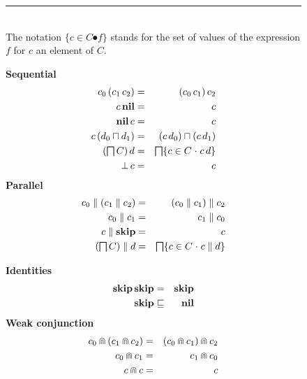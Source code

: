 \documentclass[fleqn]{fac}
\newcommand{\figurerule}{\rule{\textwidth}{0.5pt}}
\newcommand{\labelaxiom}[1]{\label{axiom-#1}\index{Axiom!#1|AxiomDef{\ref{axiom-#1}}}}
\newcommand{\SSeq}{\,}
\newcommand{\Nil}{\Keyword{nil}}
\newcommand{\nondet}{\mathbin{\sqcap}}
\newcommand{\Nondet}{\mathop{\textstyle\bigsqcap}}
\newcommand{\Strictconjunction}{Weak conjunction}
\newcommand{\together}{\mathbin{\doublecap}}
\newcommand{\Keyword}[1]{\mathsf{\mathbf{#1}}}
\newcommand{\Abort}{\Keyword{\bot}}
\newcommand{\Skip}{\Keyword{skip}}
\begin{document}
\begin{figure}
\figurerule\\
The notation $\{ c\in C \spot f \}$ stands for the set of values of the expression $f$ for $c$ an element of $C$. 
\\[2ex]
\begin{minipage}{0.49\textwidth}
\textbf{Sequential}
\begin{eqnarray}
  c_0 \SSeq (c_1 \SSeq c_2) & = & (c_0 \SSeq c_1) \SSeq c_2 \labelaxiom{sequential-associative} \\
  c \SSeq \Nil & = & c   \labelaxiom{sequential-identity-right} \\
  \Nil \SSeq c & = & c   \labelaxiom{sequential-identity-left} \\
  c \SSeq (d_0 \nondet d_1) & = & (c \SSeq d_0) \nondet (c \SSeq d_1) \labelaxiom{sequential-distribute-nondet-left} \\
  (\Nondet C) \SSeq d & = & \Nondet \{ c \in C \spot c \SSeq d \}  \labelaxiom{sequential-distribute-nondet-right} \\
  \Abort \SSeq c & = & c \labelaxiom{sequential-abort-zero-left}
\end{eqnarray}
\textbf{Parallel}
\begin{eqnarray}
  c_0 \parallel (c_1 \parallel c_2) & = & (c_0 \parallel c_1) \parallel c_2 \labelaxiom{parallel-associative}\\
  c_0 \parallel c_1 & = & c_1 \parallel c_0 \labelaxiom{parallel-commutes} \\
  c \parallel \Skip & = & c \labelaxiom{parallel-identity} \\
  (\Nondet C) \parallel d & = & \Nondet \{ c \in C \spot c \parallel d \}  \labelaxiom{parallel-distribute}
\end{eqnarray}
\end{minipage}
\quad
\begin{minipage}{0.48\textwidth}
\textbf{Identities}
\begin{eqnarray}
  \Skip \SSeq \Skip & = & \Skip  \labelaxiom{skip-skip} \\
  \Skip & \refsto & \Nil \labelaxiom{skip-nil}
\end{eqnarray}
\textbf{\Strictconjunction}
\begin{eqnarray}
  c_0 \together (c_1 \together c_2) & = & (c_0 \together c_1) \together c_2  \labelaxiom{conjunction-associative} \\
  c_0 \together c_1 & = & c_1 \together c_0  \labelaxiom{conjunction-commutes} \\
  c \together c & = & c  \labelaxiom{conjunction-idempotent} \\

\end{eqnarray}
\end{minipage}
\end{figure}
\end{document}
